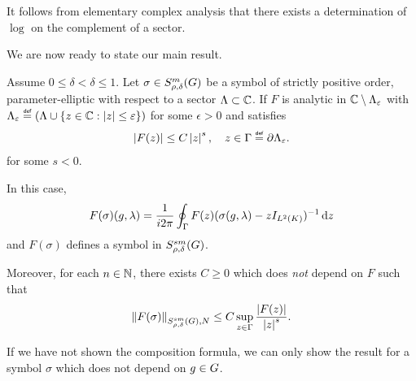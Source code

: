 It follows from elementary complex analysis that there exists a determination of $\log$ on the complement of a sector.

We are now ready to state our main result.
\begin{theorem}
\label{theorem:functional_calculus}
    Assume $0 \leq \delta < \delta \leq 1$.
    Let $\sigma \in S^{m}_{\rho, \delta}(G)$ be a symbol of strictly positive order,
    parameter-elliptic with respect to a sector $\Lambda \subset \mathbb{C}$.
    If $F$ is analytic in $\mathbb{C} \setminus \Lambda_\varepsilon$
    with $\Lambda_\epsilon \defeq (\Lambda \cup \{z \in \C : \abs z \leq \epsilon\})$ for some $\epsilon > 0$
    and satisfies
    \begin{align*}
        \abs {F(z)} \leq C \abs z^s, \quad z \in \Gamma \defeq \partial \Lambda_\epsilon.
    \end{align*}
    for some $s < 0$.

    In this case,
    \begin{align*}
        F(\sigma)(g, \lambda)
        = \frac 1 {i 2 \pi} \oint_{\Gamma} F(z) (\sigma(g, \lambda) - z {I_{{L^{2} (K)}}})^{-1} \,\mathrm{d} z
    \end{align*}
    and $F(\sigma)$ defines a symbol in $S^{s m}_{\rho, \delta}(G)$.

    Moreover,
    for each $n \in \mathbb{N}$,
    there exists $C \geq 0$ which does \emph{not} depend on $F$ such that
    \begin{align}
        \SymbolSemiNorm {s m} {\rho, \delta} N {F(\sigma)} \leq C \sup_{z \in \Gamma} \frac {\abs {F(z)}} {\abs z^s}.
        \label{eq:functional_calculus:bound_on_seminorm}
    \end{align}

    If we have not shown the composition formula,
    we can only show the result for a symbol $\sigma$ which does not depend on $g \in G$.
\end{theorem}
